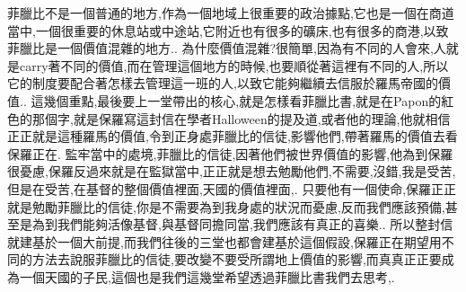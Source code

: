 \documentclass{book}
\begin{document}
菲臘比不是一個普通的地方,作為一個地域上很重要的政治據點,它也是一個在商道當中,一個很重要的休息站或中途站,它附近也有很多的礦床,也有很多的商港,以致菲臘比是一個價值混雜的地方..
為什麼價值混雜?很簡單,因為有不同的人會來,人就是carry著不同的價值,而在管理這個地方的時候,也要順從著這裡有不同的人,所以它的制度要配合著怎樣去管理這一班的人,以致它能夠繼續去信服於羅馬帝國的價值..
這幾個重點,最後要上一堂帶出的核心,就是怎樣看菲臘比書,就是在Papon的紅色的那個字,就是保羅寫這封信在學者Halloween的提及道,或者他的理論,他就相信正正就是這種羅馬的價值,令到正身處菲臘比的信徒,影響他們,帶著羅馬的價值去看保羅正在.
監牢當中的處境,菲臘比的信徒,因著他們被世界價值的影響,他為到保羅很憂慮,保羅反過來就是在監獄當中,正正就是想去勉勵他們,不需要,沒錯,我是受苦,但是在受苦,在基督的整個價值裡面,天國的價值裡面,.
只要他有一個使命,保羅正正就是勉勵菲臘比的信徒,你是不需要為到我身處的狀況而憂慮,反而我們應該預備,甚至是為到我們能夠活像基督,與基督同擔同當,我們應該有真正的喜樂..
所以整封信就建基於一個大前提,而我們往後的三堂也都會建基於這個假設,保羅正在期望用不同的方法去說服菲臘比的信徒,要改變不要受所謂地上價值的影響,而真真正正要成為一個天國的子民,這個也是我們這幾堂希望透過菲臘比書我們去思考,.
\end{document}
